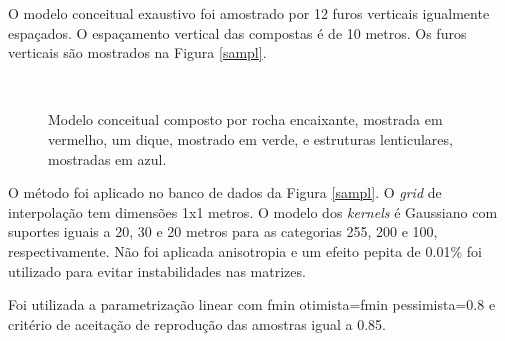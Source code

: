 O modelo conceitual exaustivo foi amostrado por 12 furos verticais igualmente espaçados. O espaçamento vertical das compostas é de 10 metros. Os furos verticais são mostrados na Figura \autoref{sampl}. 

\begin{figure}[H] 
    \centering
    \caption{Modelo conceitual composto por rocha encaixante, mostrada em vermelho, um dique, mostrado em verde, e estruturas lenticulares, mostradas em azul.} \label{concep_exhaust}
     \\
\end{figure}

O método foi aplicado no banco de dados da Figura \autoref{sampl}. O \textit{grid} de interpolação tem dimensões 1x1 metros. O modelo dos \textit{kernels} é Gaussiano com suportes iguais a 20, 30 e 20 metros para as categorias 255, 200 e 100, respectivamente. Não foi aplicada anisotropia e um efeito pepita de 0.01\% foi utilizado para evitar instabilidades nas matrizes.

Foi utilizada a parametrização linear com fmin otimista=fmin pessimista=0.8 e critério de aceitação de reprodução das amostras igual a 0.85.

